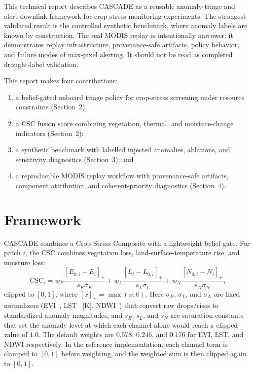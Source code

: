 \documentclass[11pt]{article}
\begin{document}
This technical report describes CASCADE as a reusable anomaly-triage and alert-downlink framework for crop-stress monitoring experiments. The strongest validated result is the controlled synthetic benchmark, where anomaly labels are known by construction. The real MODIS replay is intentionally narrower: it demonstrates replay infrastructure, provenance-safe artifacts, policy behavior, and failure modes of max-pixel alerting. It should not be read as completed drought-label validation.

This report makes four contributions:
\begin{enumerate}
\item a belief-gated onboard triage policy for crop-stress screening under resource constraints (Section~2);
\item a CSC fusion score combining vegetation, thermal, and moisture-change indicators (Section~2);
\item a synthetic benchmark with labelled injected anomalies, ablations, and sensitivity diagnostics (Section~3); and
\item a reproducible MODIS replay workflow with provenance-safe artifacts, component attribution, and coherent-priority diagnostics (Section~4).
\end{enumerate}

\section{Framework}

CASCADE combines a Crop Stress Composite with a lightweight belief gate. For patch $i$, the CSC combines vegetation loss, land-surface-temperature rise, and moisture loss:
\begin{equation}
\mathrm{CSC}_i =
w_E\frac{[E_{0,i}-E_i]_+}{s_E\sigma_E}
+w_L\frac{[L_i-L_{0,i}]_+}{s_L\sigma_L}
+w_N\frac{[N_{0,i}-N_i]_+}{s_N\sigma_N},
\label{eq:csc}
\end{equation}
clipped to $[0,1]$, where $[x]_+=\max(x,0)$. Here $\sigma_E$, $\sigma_L$, and $\sigma_N$ are fixed normalizers (EVI~\cite{huete2002modis}, LST~\cite{wan1996generalized} [K], NDWI~\cite{gao1996ndwi}) that convert raw drops/rises to standardized anomaly magnitudes, and $s_E$, $s_L$, and $s_N$ are saturation constants that set the anomaly level at which each channel alone would reach a clipped value of $1.0$. The default weights are $0.578$, $0.246$, and $0.176$ for EVI, LST, and NDWI respectively.
In the reference implementation, each channel term is clamped to $[0,1]$ before weighting, and the weighted sum is then clipped again to $[0,1]$.
\end{document}
